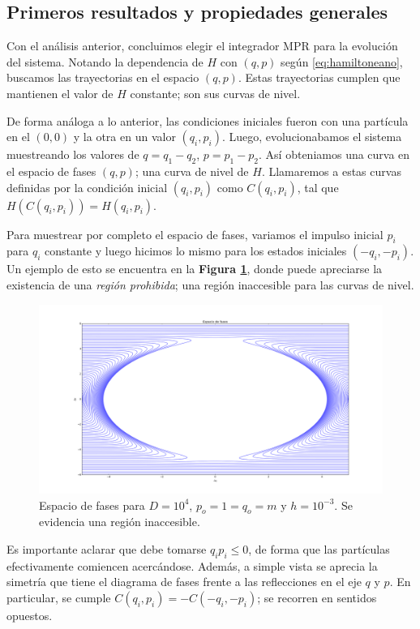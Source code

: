 \documentclass[twoside, 12pt]{article}
\begin{document}
\subsection{Primeros resultados y propiedades generales}

Con el análisis anterior, concluimos elegir el integrador MPR para la evolución del sistema. 
Notando la dependencia de $H$ con $(q,p)$ según \eqref{eq:hamiltoneano}, buscamos las trayectorias en el espacio $(q,p)$.
Estas trayectorias cumplen que mantienen el valor de $H$ constante; son sus curvas de nivel. 

De forma análoga a lo anterior, las condiciones iniciales fueron con una partícula en el $(0,0)$ y la otra en un valor $(q_i, p_i)$. 
Luego, evolucionabamos el sistema muestreando los valores de $q = q_1 - q_2$, $p = p_1 - p_2$.
Así obteniamos una curva en el espacio de fases $(q,p)$; una curva de nivel de $H$.
Llamaremos a estas curvas definidas por la condición inicial $(q_i,p_i)$ como $C(q_i,p_i)$, tal que $H(C(q_i,p_i))=H(q_i, p_i)$.

Para muestrear por completo el espacio de fases, variamos el impulso inicial $p_i$ para $q_i$ constante y luego hicimos lo mismo para los estados iniciales $(-q_i,-p_i)$.
Un ejemplo de esto se encuentra en la \textbf{Figura \ref{fig:ej_fases}}, donde puede apreciarse la existencia de una \textit{región prohibida}; una región inaccesible para las curvas de nivel.

\begin{figure}[h]
	\centering
	\includegraphics[trim = 0mm 0mm 15mm 10mm, clip, width=\columnwidth]{fases.png}
	\caption{Espacio de fases para $D=10^4$, $p_o=1=q_o=m$ y $h=10^{-3}$. Se evidencia una región inaccesible.}
	\label{fig:ej_fases}
\end{figure}

Es importante aclarar que debe tomarse $q_ip_i\leq 0$, de forma que las partículas efectivamente comiencen acercándose.
Además, a simple vista se aprecia la simetría que tiene el diagrama de fases frente a las reflecciones en el eje $q$ y $p$.
En particular, se cumple $C(q_i,p_i) = -C(-q_i,-p_i)$; se recorren en sentidos opuestos.  
\end{document}
